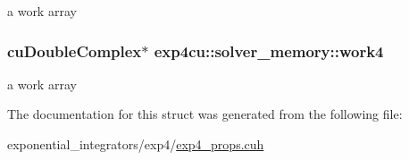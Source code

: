 a work array 

\subsubsection[{\texorpdfstring{work4}{work4}}]{\setlength{\rightskip}{0pt plus 5cm}cu\+Double\+Complex$\ast$ exp4cu\+::solver\+\_\+memory\+::work4}\hypertarget{structexp4cu_1_1solver__memory_a8b2943ea29259b541a9143409bc8317d}{}\label{structexp4cu_1_1solver__memory_a8b2943ea29259b541a9143409bc8317d}


a work array 



The documentation for this struct was generated from the following file\+:\begin{DoxyCompactItemize}
\item 
exponential\+\_\+integrators/exp4/\hyperlink{exp4__props_8cuh}{exp4\+\_\+props.\+cuh}\end{DoxyCompactItemize}
